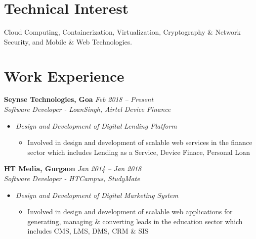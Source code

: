 \documentclass[margin,line]{resume}
\begin{document}
\begin{resume}
     \section{\mysidestyle Technical Interest}
        Cloud Computing, Containerization, Virtualization, Cryptography \& Network Security, and Mobile \& Web Technologies.

    \section{\mysidestyle Work Experience}

    \textbf{Seynse Technologies, Goa} \hfill \textsl{Feb 2018 -- Present} \vspace{0mm}\\\vspace{0mm}%
           \textsl{Software Developer - LoanSingh, Airtel Device Finance}\\
    \begin{itemize}
    
     \item \textsl{Design and Development of Digital Lending Platform}
        \begin{itemize}
            \item Involved in design and development of scalable web services in the finance sector which includes
            Lending as a Service, Device Finace, Personal Loan
        \end{itemize}
    \end{itemize}

    \textbf{HT Media, Gurgaon} \hfill \textsl{Jan 2014 -- Jan 2018} \vspace{0mm}\\\vspace{0mm}%
           \textsl{Software Developer - HTCampus, StudyMate}\\
    \begin{itemize}
    
     \item \textsl{Design and Development of Digital Marketing System}
        \begin{itemize}
            \item Involved in design and development of scalable web applications for generating, managing \& converting leads
            in the education sector which includes CMS, LMS, DMS, CRM \& SIS
        \end{itemize}
   \end{itemize}


\end{resume}
\end{document}
